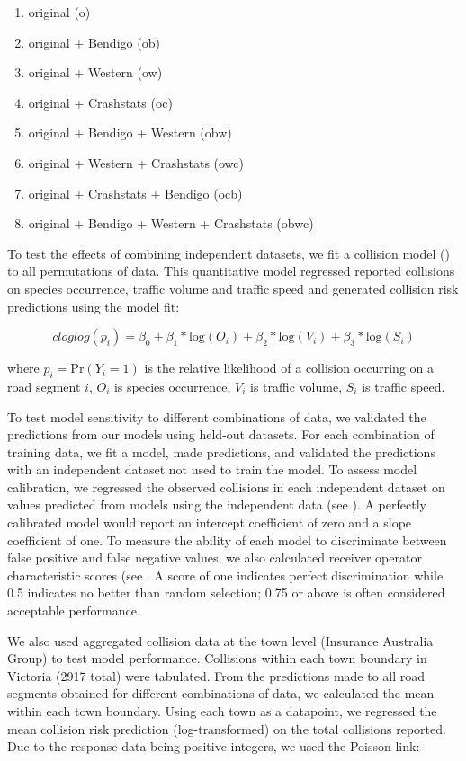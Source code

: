 \begin{enumerate}
	\item original (o)
	\item original + Bendigo (ob)
	\item original + Western (ow)
	\item original + Crashstats (oc)
	\item original + Bendigo + Western (obw)
	\item original + Western + Crashstats (owc)
	\item original + Crashstats + Bendigo (ocb)
	\item original + Bendigo + Western + Crashstats (obwc)
\end{enumerate}

To test the effects of combining independent datasets, we fit a collision model () to all permutations of data.  This quantitative model regressed reported collisions on species occurrence, traffic volume and traffic speed and generated collision risk predictions using the model fit:

\begin{equation} \label{eq:61}
cloglog(p_i) = \beta_0 + \beta_1*\text{log}(O_i) + \beta_2*\text{log}(V_i) + \beta_3*\text{log}(S_i)
\end{equation}

\noindent where $p_i=\text{Pr}(Y_i=1)$ is the relative likelihood of a collision occurring on a road segment $i$, $O_i$ is species occurrence, $V_i$ is traffic volume, $S_i$ is traffic speed.

To test model sensitivity to different combinations of data, we validated the predictions from our models using held-out datasets. For each combination of training data, we fit a model, made predictions, and validated the predictions with an independent dataset not used to train the model. To assess model calibration, we regressed the observed collisions in each independent dataset on values predicted from models using the independent data (see \cite{mill91}). A perfectly calibrated model would report an intercept coefficient of zero and a slope coefficient of one. To measure the ability of each model to discriminate between false positive and false negative values, we also calculated receiver operator characteristic scores (see \cite{metz78}. A score of one indicates perfect discrimination while 0.5 indicates no better than random selection; 0.75 or above is often considered acceptable performance.

We also used aggregated collision data at the town level (Insurance Australia Group) to test model performance. Collisions within each town boundary in Victoria (2917 total) were tabulated. From the predictions made to all road segments obtained for different combinations of data, we calculated the mean within each town boundary. Using each town as a datapoint, we regressed the mean collision risk prediction (log-transformed) on the total collisions reported. Due to the response data being positive integers, we used the Poisson link:

